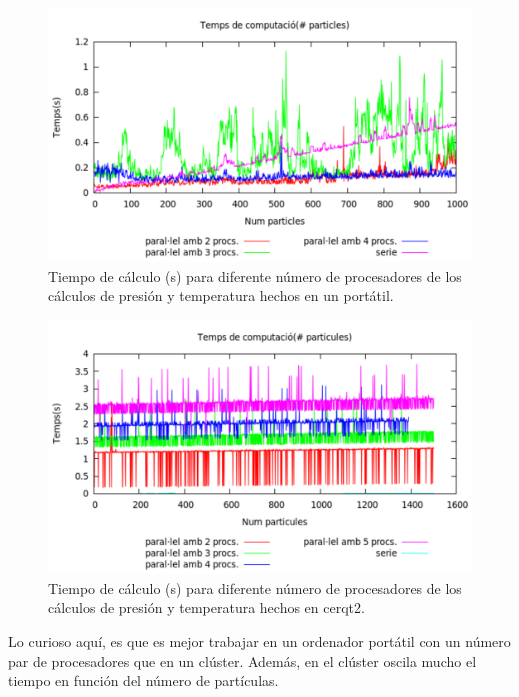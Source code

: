 \documentclass[onecolumn]{article}
\begin{document}
\begin{figure}[h!]
\includegraphics[scale=0.50]{bench_ana_workerII.pdf} 
\caption{Tiempo de cálculo (s) para diferente número de procesadores de los cálculos de presión y temperatura hechos en un portátil.} 
\label{fig:workerii_ana}
\end{figure}
\begin{figure}[h!]
\includegraphics[scale=0.50]{bench_ana_cerqt2.pdf} 
\caption{Tiempo de cálculo (s) para diferente número de procesadores de los cálculos de presión y temperatura hechos en cerqt2.} 
\label{fig:cerqt2_ana}
\end{figure}
Lo curioso aquí, es que es mejor trabajar en un ordenador portátil con un número par de procesadores que en un clúster. Además, en el clúster oscila mucho el tiempo en función del número de partículas.
\end{document}

